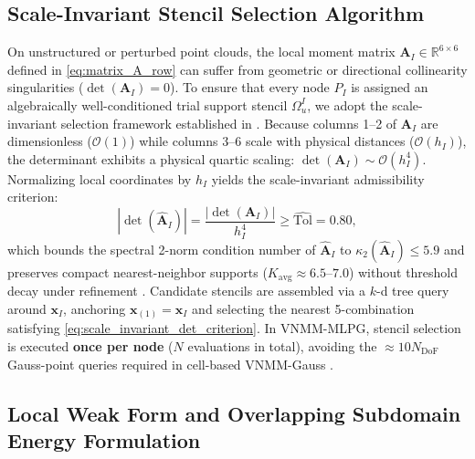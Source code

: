\documentclass[VANCOUVER,Times1COL]{WileyNJD-v5}
\begin{document}
\subsection{Scale-Invariant Stencil Selection Algorithm}
\label{subsec:stencil_selection}

On unstructured or perturbed point clouds, the local moment matrix $\mathbf{A}_I \in \mathbb{R}^{6 \times 6}$ defined in \eqref{eq:matrix_A_row} can suffer from geometric or directional collinearity singularities ($\det(\mathbf{A}_I) = 0$). To ensure that every node $P_I$ is assigned an algebraically well-conditioned trial support stencil $\Omega_u^I$, we adopt the scale-invariant selection framework established in \cite{stable_vnmm2d_2026}.
Because columns 1--2 of $\mathbf{A}_I$ are dimensionless ($\mathcal{O}(1)$) while columns 3--6 scale with physical distances ($\mathcal{O}(h_I)$), the determinant exhibits a physical quartic scaling: $\det(\mathbf{A}_I) \sim \mathcal{O}(h_I^4)$. Normalizing local coordinates by $h_I$ yields the scale-invariant admissibility criterion:
\begin{equation}
    |\det(\widehat{\mathbf{A}}_I)| = \frac{|\det(\mathbf{A}_I)|}{h_I^4} \ge \widehat{\mathrm{Tol}} = 0.80,
    \label{eq:scale_invariant_det_criterion}
\end{equation}
which bounds the spectral 2-norm condition number of $\widehat{\mathbf{A}}_I$ to $\kappa_2(\widehat{\mathbf{A}}_I) \le 5.9$ and preserves compact nearest-neighbor supports ($K_{\mathrm{avg}} \approx 6.5\text{--}7.0$) without threshold decay under refinement \cite{stable_vnmm2d_2026}. Candidate stencils are assembled via a $k$-d tree query around $\mathbf{x}_I$, anchoring $\mathbf{x}_{(1)} = \mathbf{x}_I$ and selecting the nearest 5-combination satisfying \eqref{eq:scale_invariant_det_criterion}. In VNMM-MLPG, stencil selection is executed \textbf{once per node} ($N$ evaluations in total), avoiding the $\approx 10 N_{\mathrm{DoF}}$ Gauss-point queries required in cell-based VNMM-Gauss \cite{stable_vnmm2d_2026}.

\subsection{Local Weak Form and Overlapping Subdomain Energy Formulation}
\label{subsec:local_weak_form}
\end{document}
